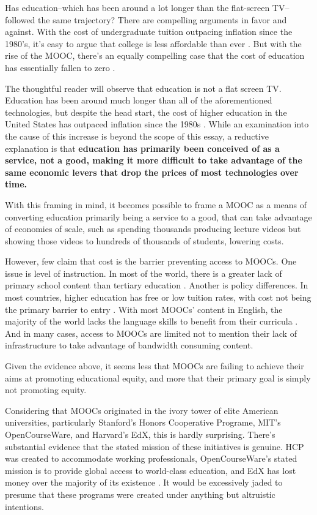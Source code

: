 \documentclass[
	letterpaper, %
]{jdf}
\begin{document}
Has education–which has been around a lot longer than the flat-screen TV–followed the same trajectory? There are compelling arguments in favor and against. With the cost of undergraduate tuition outpacing inflation since the 1980's, it's easy to argue that college is less affordable than ever . But with the rise of the MOOC, there's an equally compelling case that the cost of education has essentially fallen to zero .




The thoughtful reader will observe that education is not a flat screen TV. Education has been around much longer than all of the aforementioned technologies, but despite the head start, the cost of higher education in the United States has outpaced inflation since the 1980s . While an examination into the cause of this increase is beyond the scope of this essay, a reductive explanation is that \textbf{education has primarily been conceived of as a service, not a good, making it more difficult to take advantage of the same economic levers that drop the prices of most technologies over time.}

With this framing in mind, it becomes possible to frame a MOOC as a means of converting education primarily being a service to a good, that can take advantage of economies of scale, such as spending thousands producing lecture videos but showing those videos to hundreds of thousands of students, lowering costs.

However, few claim that cost is the barrier preventing access to MOOCs. One issue is level of instruction. In most of the world, there is a greater lack of primary school content than tertiary education . Another is policy differences. In most countries, higher education has free or low tuition rates, with cost not being the primary barrier to entry . With most MOOCs' content in English, the majority of the world lacks the language skills to benefit from their curricula . And in many cases, access to MOOCs are limited not to mention their lack of infrastructure to take advantage of bandwidth consuming content.

Given the evidence above, it seems less that MOOCs are failing to achieve their aims at promoting educational equity, and more that their primary goal is simply not promoting equity. 

Considering that MOOCs originated in the ivory tower of elite American universities, particularly Stanford's Honors Cooperative Programe, MIT's OpenCourseWare, and Harvard's EdX, this is hardly surprising. There's substantial evidence that the stated mission of these initiatives is genuine. HCP was created to accommodate working professionals, OpenCourseWare's stated mission is to provide global access to world-class education, and EdX has lost money over the majority of its existence . It would be excessively jaded to presume that these programs were created under anything but altruistic intentions.
\end{document}
